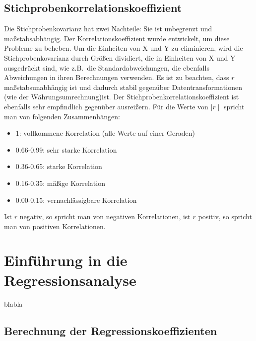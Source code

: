 \subsection{Stichprobenkorrelationskoeffizient}
Die Stichprobenkovarianz hat zwei Nachteile: Sie ist unbegrenzt und maßstabsabhängig.
Der Korrelationskoeffizient wurde entwickelt, um diese Probleme zu beheben.
Um die Einheiten von X und Y zu eliminieren, wird die Stichprobenkovarianz durch Größen dividiert, die in Einheiten von X und Y ausgedrückt sind, wie z.B.\ die Standardabweichungen, die ebenfalls Abweichungen in ihren Berechnungen verwenden.
Es ist zu beachten, dass $r$ maßstabsunabhängig ist und dadurch stabil gegenüber Datentransformationen (wie der Währungsumrechnung)ist.
Der Stichprobenkorrelationskoeffizient ist ebenfalls sehr empfindlich gegenüber ausreißern.
\newline
Für die Werte von $\mid r\mid$ spricht man von folgenden Zusammenhängen:
\begin{itemize}
    \item 1: vollkommene Korrelation (alle Werte auf einer Geraden)
    \item 0.66-0.99: sehr starke Korrelation
    \item 0.36-0.65: starke Korrelation
    \item 0.16-0.35: mäßige Korrelation
    \item 0.00-0.15: vernachlässigbare Korrelation
\end{itemize}
Ist $r$ negativ, so spricht man von negativen Korrelationen, ist $r$ positiv, so spricht man von positiven Korrelationen.

\section{Einführung in die Regressionsanalyse}
blabla

\subsection{Berechnung der Regressionskoeffizienten}
